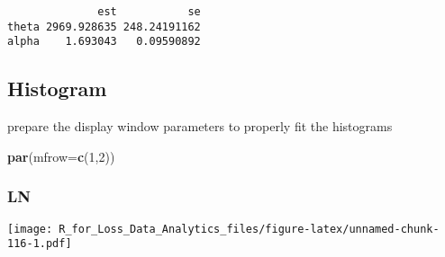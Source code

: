 \documentclass[]{book}
\newenvironment{Shaded}{\begin{snugshade}}{\end{snugshade}}
\newcommand{\KeywordTok}[1]{\textcolor[rgb]{0.13,0.29,0.53}{\textbf{#1}}}
\newcommand{\DataTypeTok}[1]{\textcolor[rgb]{0.13,0.29,0.53}{#1}}
\newcommand{\DecValTok}[1]{\textcolor[rgb]{0.00,0.00,0.81}{#1}}
\newcommand{\FloatTok}[1]{\textcolor[rgb]{0.00,0.00,0.81}{#1}}
\newcommand{\StringTok}[1]{\textcolor[rgb]{0.31,0.60,0.02}{#1}}
\newcommand{\OperatorTok}[1]{\textcolor[rgb]{0.81,0.36,0.00}{\textbf{#1}}}
\newcommand{\NormalTok}[1]{#1}
\theoremstyle{definition}
\theoremstyle{definition}
\theoremstyle{definition}
\theoremstyle{remark}
\begin{document}
\begin{verbatim}
              est           se
theta 2969.928635 248.24191162
alpha    1.693043   0.09590892
\end{verbatim}

\subsection{Histogram}\label{histogram}

prepare the display window parameters to properly fit the histograms

\begin{Shaded}
\begin{Highlighting}[]
\KeywordTok{par}\NormalTok{(}\DataTypeTok{mfrow=}\KeywordTok{c}\NormalTok{(}\DecValTok{1}\NormalTok{,}\DecValTok{2}\NormalTok{))}
\end{Highlighting}
\end{Shaded}

\subsubsection{LN}\label{ln}

\begin{Shaded}
\end{Shaded}

\texttt{[image: R\_for\_Loss\_Data\_Analytics\_files/figure-latex/unnamed-chunk-116-1.pdf]}
\end{document}
